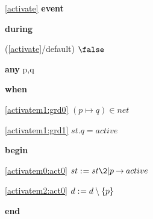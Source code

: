 \noindent \ref{activate}  \textbf{event}
\begin{block}
  \item   \textbf{during}
  \begin{block}
  \item[ (\ref{activate}/default) ]{$\false$} %
  \end{block}
  \item   \textbf{any} p,q
  \item   \textbf{when}
  \begin{block}
  \item[ \eqref{activatem1:grd0} ]{$(p \mapsto q) \in net $} %
  \item[ \eqref{activatem1:grd1} ]{$st.q = active $} %
  \end{block}
  \item   \textbf{begin}
  \begin{block}
  \item[ \eqref{activatem0:act0} ]{$st \bcmeq st \2| p \fun active $} %
  \item[ \eqref{activatem2:act0} ]{$d \mathrel{:\mkern1mu=} d \setminus \{ p \}$} %
  \end{block}
  \item   \textbf{end} \\
\end{block}
